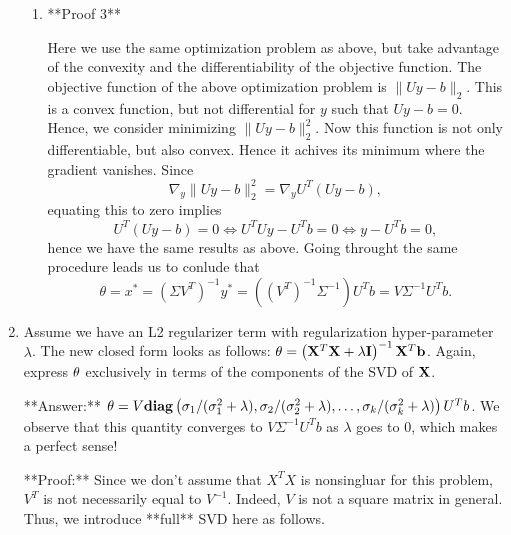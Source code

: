 \begin{enumerate}
\begin{solution}
\begin{enumerate}
\item 

**Proof 3**

Here we use the same optimization problem as above, but take advantage of the convexity and the differentiability of the objective function.
The objective function of the above optimization problem is $\|Uy-b\|_2$. This is a convex function, but not differential for $y$ such that $Uy-b=0$.
Hence, we consider minimizing $\|Uy-b\|_2^2$. Now this function is not only differentiable, but also convex.
Hence it achives its minimum where the gradient vanishes.
Since
\begin{equation}
\nabla_y \|Uy-b\|_2^2 = \nabla_y U^T(Uy-b),
\end{equation}
equating this to zero implies
\begin{equation}
U^T(Uy-b) = 0 \Leftrightarrow U^TUy - U^Tb = 0 \Leftrightarrow y - U^Tb=0,
\end{equation}
hence we have the same results as above. Going throught the same procedure leads us to conlude that
\begin{equation}
\theta = x^\ast = (\Sigma V^T)^{-1} y^\ast = ((V^T)^{-1} \Sigma^{-1}) U^T b = V \Sigma^{-1} U^T b.
\end{equation}


\end{enumerate}

\end{solution}




\item Assume we have an L2 regularizer term with regularization hyper-parameter $\lambda$. The new closed form looks as follows: ${\bf{\theta}} = \left({\bf{X}}^T {\bf{X}} + \lambda {\bf{I}}\right)^{-1}{\bf{X}}^T {\bf{b}}$. Again, express $\bf{\theta}$ exclusively in terms of the components of the SVD of $\bf{X}$.

**Answer:**
$\theta = V \mathbf{diag} \left(\sigma_1/(\sigma_1^2+\lambda), \sigma_2/(\sigma_2^2+\lambda), \ldots, \sigma_k/(\sigma_k^2+\lambda) \right) U^T b$.
We observe that this quantity converges to $V\Sigma^{-1}U^Tb$ as $\lambda$ goes to $0$, which makes a perfect sense!

\begin{solution}


**Proof:** Since we don't assume that $X^TX$ is nonsingluar for this problem,
$V^T$ is not necessarily equal to $V^{-1}$. Indeed, $V$ is not a square matrix in general.
Thus, we introduce **full** SVD here as follows.


\end{solution}
\end{enumerate}
